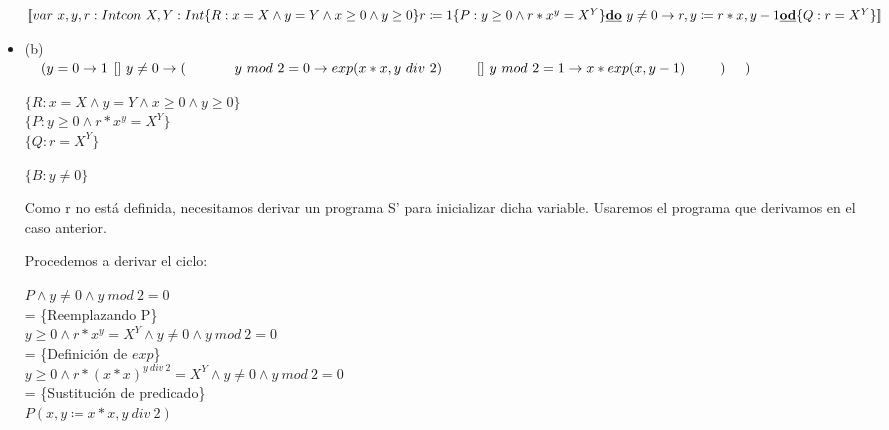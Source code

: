 \documentclass[12pt]{article}
\begin{document}
\begin{itemize}
    $[\![\\
    var~ x, y, r : Int\\
    con~ X, Y : Int\\
    \{R: x = X \land y = Y \land x \ge 0 \land y \ge 0 \}\\
    r \coloneqq 1\\
    \{P: y \ge 0 \land r * x^y = X^Y\}\\
    \textbf{\underline{do}}~ y \neq 0 \rightarrow r, y \coloneqq r * x, y - 1\\
    \textbf{\underline{od}}\\
    \{Q: r = X^Y\}\\
    ]\!]$

    \bigbreak

    \item (b)\\
          $\hspace*{10pt}(y = 0 \rightarrow 1\\
          \hspace*{4pt}[]~y \neq 0 \rightarrow (\\
          \hspace*{35pt}y ~mod~ 2 = 0 \rightarrow exp(x * x, y ~div~ 2)\\
          \hspace*{25pt}[]~y~mod~2 = 1 \rightarrow x * exp(x, y - 1)\\
          \hspace*{25pt})\\
          \hspace*{14pt})$

    $\{R: x = X \land y = Y \land x \ge 0 \land y \ge 0\}$\\
    $\{P: y \ge 0 \land r * x^y = X^Y\}$\\
    $\{Q: r = X^Y\}$

    $\{B: y \neq 0\}$

    \bigbreak

    Como r no está definida, necesitamos derivar un programa S' 
    para inicializar dicha variable. Usaremos el programa que 
    derivamos en el caso anterior.

    \bigbreak

    Procedemos a derivar el ciclo:

    $P \land y \neq 0 \land y ~mod~ 2 = 0$\\
    = \{Reemplazando P\}\\
    $y \ge 0 \land r * x^y = X^Y \land y \neq 0 \land y ~mod~ 2 = 0$\\
    = \{Definición de $exp$\}\\
    $y \ge 0 \land r * (x * x)^{y ~div~ 2} = X^Y \land y \neq 0 \land y ~mod~ 2 = 0$\\
    = \{Sustitución de predicado\}\\
    $P(x, y \coloneqq x * x, y ~div~ 2)$\\


\end{itemize}
\end{document}
